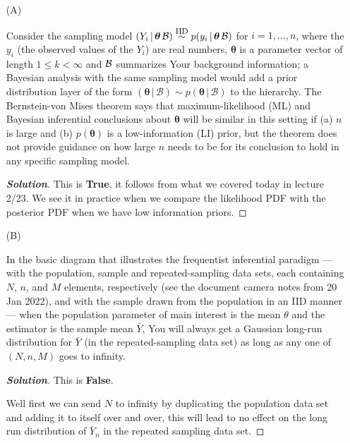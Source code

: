 \documentclass[12pt]{article}
\newcommand{\given}{\, | \,}
\newenvironment{solution}{\begin{tcolorbox}[breakable]\begin{proof}[\textbf{\textit{Solution}}] }{\end{proof}\end{tcolorbox}}
\begin{document}
\begin{itemize}

\item[(A)]

Consider the sampling model $( Y_i \given \bm{ \theta } \, { \cal B } ) \stackrel{ \textrm{\footnotesize IID} }{ \sim } p ( y_i \given \bm{ \theta } \, { \cal B } )$ for $i = 1, \dots, n$, where the $y_i$ (the observed values of the $Y_i$) are real numbers, $\bm{ \theta }$ is a parameter vector of length $1 \le k < \infty$ and $\cal B$ summarizes Your background information; a Bayesian analysis with the same sampling model would add a prior distribution layer of the form $( \bm{ \theta } \given \mathcal{ B } ) \sim p ( \bm{ \theta } \given \mathcal{ B } )$ to the hierarchy. The Bernstein-von Mises theorem says that maximum-likelihood (ML) and Bayesian inferential conclusions about $\bm{ \theta }$ will be similar in this setting if (a) $n$ is large and (b) $p ( \bm{ \theta } )$ is a low-information (LI) prior, but the theorem does not provide guidance on how large $n$ needs to be for its conclusion to hold in any specific sampling model. 

\begin{solution}
    This is \textbf{True}, it follows from what we covered today in lecture 2/23. We see it in practice when we compare the likelihood PDF with the posterior PDF when we have low information priors.
\end{solution}

\item[(B)]

In the basic diagram that illustrates the frequentist inferential paradigm
 --- with the population, sample and repeated-sampling data sets, each containing $N$, $n$, and $M$ elements, respectively (see the document camera notes from 20 Jan 2022), and with the sample drawn from the population in an IID manner --- when the population parameter of main interest is the mean $\theta$ and the estimator is the sample mean $\bar{ Y }$, You will always get a Gaussian long-run distribution for $\bar{ Y }$ (in the repeated-sampling data set) as long as any one of $( N, n, M )$ goes to infinity. 

 \begin{solution}
    This is \textbf{False}.


     Well first we can send $N$ to infinity by duplicating the population data set and adding it to itself over and over, this will lead to no effect on the long run distribution of $\bar{Y}_n$ in the repeated sampling data set. 
     

\end{solution}
\end{itemize}
\end{document}
